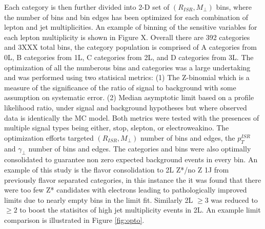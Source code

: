 Each category is then further divided into 2-D set of $(R_{ISR}, M_\perp)$ bins, where the number of bins and bin edges has been optimized for each combination of lepton and jet multiplicities. An example of binning of the sensitive variables for each lepton multiplicity is shown in Figure X.
Overall there are 392 categories and 3XXX total bins, the category population is comprised of A categories from 0L, B categories from 1L, C categories from 2L, and D categories from 3L. The optimization of all the numberous bins and categories was a large undertaking and was performed using two statisical metrics: (1) The Z-binomial \cite{zbi} which is a measure of the significance of the ratio of signal to background with some assumption on systematic error. (2)  Median asymptotic limit based on a profile likelihood ratio, under signal and background hypotheses but where observed data is identically the MC model. Both metrics were tested with the presences of multiple signal types being either, stop, slepton, or electroweakino. The optimization efforts targeted $(R_{ISR}, M_\perp)$ number of bins and edges, the $p_T^{ISR}$ and $\gamma_\perp$ number of bins and edges. The categories and bins were also optimally consolidated to guarantee non zero expected background events in every bin. An example of this study is the flavor consolidation to 2L Z*/no Z 1J from previously flavor separated categories, in this instance the it was found that there were too few Z* candidates with electrons leading to pathologically improved limits due to nearly empty bins in the limit fit. Similarly 2L $\geq 3$ was reduced to $\geq 2$ to boost the statisitcs of high jet multiplicity events in 2L. An example limit comparison is illustrated in Figure \ref{fig:opto}.

